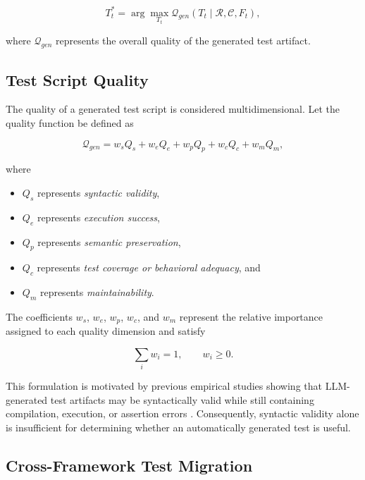 \documentclass[pdflatex,sn-mathphys-num]{sn-jnl}
\begin{document}
\begin{equation}
    T_t^{*}
    =
    \arg\max_{T_t}
    \mathcal{Q}_{gen}(T_t \mid \mathcal{R},\mathcal{C},F_t),
\label{eq:generation-objective}
\end{equation}

where $\mathcal{Q}_{gen}$ represents the overall quality of the generated
test artifact.

\subsection{Test Script Quality}

The quality of a generated test script is considered multidimensional.
Let the quality function be defined as

\begin{equation}
    \mathcal{Q}_{gen}
    =
    w_s Q_s
    +
    w_e Q_e
    +
    w_p Q_p
    +
    w_c Q_c
    +
    w_m Q_m ,
\label{eq:quality}
\end{equation}

where

\begin{itemize}
    \item $Q_s$ represents \textit{syntactic validity},
    \item $Q_e$ represents \textit{execution success},
    \item $Q_p$ represents \textit{semantic preservation},
    \item $Q_c$ represents \textit{test coverage or behavioral adequacy}, and
    \item $Q_m$ represents \textit{maintainability}.
\end{itemize}

The coefficients $w_s$, $w_e$, $w_p$, $w_c$, and $w_m$ represent the
relative importance assigned to each quality dimension and satisfy

\begin{equation}
    \sum_{i} w_i = 1,
    \qquad
    w_i \geq 0.
\end{equation}

This formulation is motivated by previous empirical studies showing that
LLM-generated test artifacts may be syntactically valid while still
containing compilation, execution, or assertion errors
\cite{yuan2024chatgpt,schafer2024testpilot}. Consequently, syntactic
validity alone is insufficient for determining whether an automatically
generated test is useful.

\subsection{Cross-Framework Test Migration}
\end{document}
